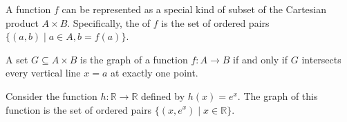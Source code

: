 \documentclass[11pt]{article}
\begin{document}
\begin{fact}
    A function \( f \) can be represented as a special kind of subset of the Cartesian product \( A \times B \). Specifically, the  of \( f \) is the set of ordered pairs \( \{(a, b) \mid a \in A, b = f(a)\} \).
\end{fact}

\begin{center}
\end{center}

\begin{proposition}
    A set \( G \subseteq A \times B \) is the graph of a function \( f: A \to B \) if and only if \( G \) intersects every vertical line \( x = a \) at exactly one point.
\end{proposition}

\begin{example}
    Consider the function \( h: \mathbb{R} \to \mathbb{R} \) defined by \( h(x) = e^x \). The graph of this function is the set of ordered pairs \( \{(x, e^x) \mid x \in \mathbb{R}\} \).
\end{example}

\begin{center}
\end{center}
\end{document}

